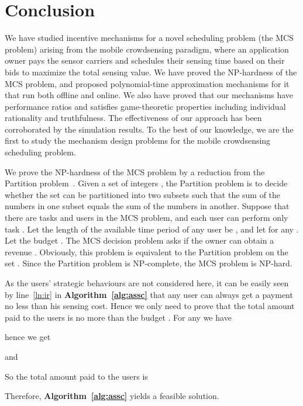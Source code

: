 \documentclass[10pt,journal,compsoc]{IEEEtran}
\begin{document}
\section{Conclusion} \label{sec:con}
We have studied incentive mechanisms for a novel scheduling problem (the MCS problem) arising from the mobile crowdsensing paradigm, where an application owner pays the sensor carriers and schedules their sensing time based on their bids to maximize the total sensing value. We have proved the NP-hardness of the MCS problem, and proposed polynomial-time approximation mechanisms for it that run both offline and online. We also have proved that our mechanisms have  performance ratios and satisfies game-theoretic properties including individual rationality and truthfulness. The effectiveness of our approach has been corroborated by the simulation results. To the best of our knowledge, we are the first to study the mechanism design problems for the mobile crowdsensing scheduling problem.





\appendix
\begin{IEEEproof}
We prove the NP-hardness of the MCS problem by a reduction from the Partition problem~\cite{Garey1990}. Given a set of  integers , the Partition problem is to decide whether the set  can be partitioned into two subsets such that the sum of the numbers in one subset equals the sum of the numbers in another. Suppose that there are  tasks and  users in the MCS problem, and each user  can perform only task . Let the length of the available time period of any user be , and let  for any . Let the budget . The MCS decision problem asks if the owner can obtain a revenue . Obviously, this problem is equivalent to the Partition problem on the set . Since the Partition problem is NP-complete, the MCS problem is NP-hard.
\end{IEEEproof}

\begin{IEEEproof}
As the users' strategic behaviours are not considered here, it can be easily seen by line~\ref{ln:ir} in \textbf{Algorithm~\ref{alg:assc}} that any user can always get a payment no less than his sensing cost. Hence we only need to prove that the total amount paid to the users is no more than the budget . For any  we have

hence we get

and

So the total amount paid to the users is

Therefore, \textbf{Algorithm~\ref{alg:assc}} yields a feasible solution.
\end{IEEEproof}
\end{document}
